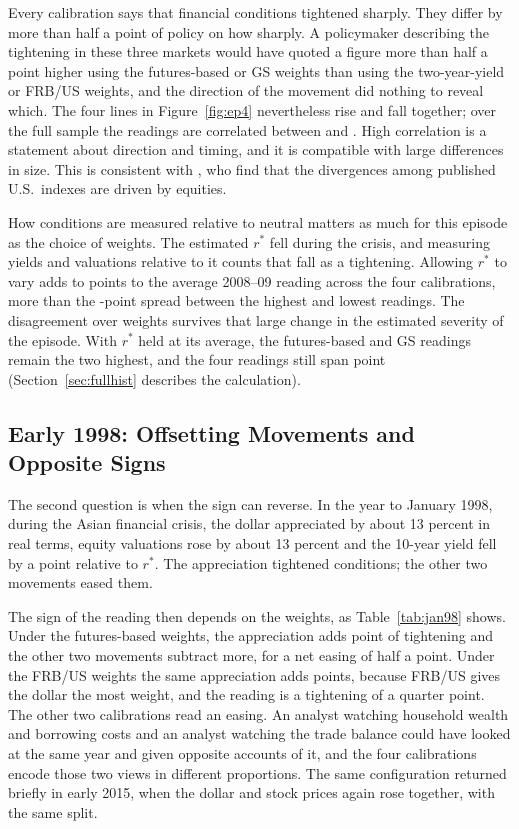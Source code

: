 \documentclass[11pt]{article}
\begin{document}
Every calibration says that financial conditions tightened sharply. They differ by more than half a point of policy on how sharply. A policymaker describing the tightening in these three markets would have quoted a figure more than half a point higher using the futures-based or GS weights than using the two-year-yield or FRB/US weights, and the direction of the movement did nothing to reveal which. The four lines in Figure~\ref{fig:ep4} nevertheless rise and fall together; over the full sample the readings are correlated between  and . High correlation is a statement about direction and timing, and it is compatible with large differences in size. This is consistent with \citet{bletzinger2026}, who find that the divergences among published U.S.\ indexes are driven by equities.

How conditions are measured relative to neutral matters as much for this episode as the choice of weights. The estimated $r^*$ fell during the crisis, and measuring yields and valuations relative to it counts that fall as a tightening. Allowing $r^*$ to vary adds  to  points to the average 2008--09 reading across the four calibrations, more than the -point spread between the highest and lowest readings. The disagreement over weights survives that large change in the estimated severity of the episode. With $r^*$ held at its average, the futures-based and GS readings remain the two highest, and the four readings still span  point (Section~\ref{sec:fullhist} describes the calculation).

\subsection{Early 1998: Offsetting Movements and Opposite Signs}\label{sec:asia}
The second question is when the sign can reverse. In the year to January 1998, during the Asian financial crisis, the dollar appreciated by about 13 percent in real terms, equity valuations rose by about 13 percent and the 10-year yield fell by a point relative to $r^*$. The appreciation tightened conditions; the other two movements eased them.

The sign of the reading then depends on the weights, as Table~\ref{tab:jan98} shows. Under the futures-based weights, the appreciation adds  point of tightening and the other two movements subtract more, for a net easing of half a point. Under the FRB/US weights the same appreciation adds  points, because FRB/US gives the dollar the most weight, and the reading is a tightening of a quarter point. The other two calibrations read an easing. An analyst watching household wealth and borrowing costs and an analyst watching the trade balance could have looked at the same year and given opposite accounts of it, and the four calibrations encode those two views in different proportions. The same configuration returned briefly in early 2015, when the dollar and stock prices again rose together, with the same split.
\end{document}
